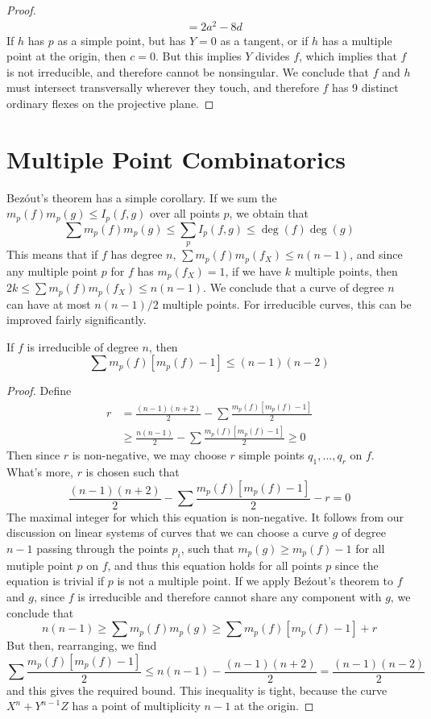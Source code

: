\begin{proof}
\begin{align*}
        &= 2a^2 - 8d
    \end{align*}
    If $h$ has $p$ as a simple point, but has $Y = 0$ as a tangent, or if $h$ has a multiple point at the origin, then $c = 0$. But this implies $Y$ divides $f$, which implies that $f$ is not irreducible, and therefore cannot be nonsingular. We conclude that $f$ and $h$ must intersect transversally wherever they touch, and therefore $f$ has 9 distinct ordinary flexes on the projective plane.
\end{proof}

\section{Multiple Point Combinatorics}

Bez\'{o}ut's theorem has a simple corollary. If we sum the $m_p(f) m_p(g) \leq I_p(f,g)$ over all points $p$, we obtain that
%
\[ \sum m_p(f)m_p(g) \leq \sum_p I_p(f,g) \leq \deg(f) \deg(g) \]
%
This means that if $f$ has degree $n$, $\sum m_p(f) m_p(f_X) \leq n(n-1)$, and since any multiple point $p$ for $f$ has $m_p(f_X) = 1$, if we have $k$ multiple points, then $2k \leq \sum m_p(f) m_p(f_X) \leq n(n-1)$. We conclude that a curve of degree $n$ can have at most $n(n-1)/2$ multiple points. For irreducible curves, this can be improved fairly significantly.

\begin{theorem}
    If $f$ is irreducible of degree $n$, then
    \[ \sum m_p(f)[m_p(f) - 1] \leq (n-1)(n-2) \]
\end{theorem}
\begin{proof}
    Define
    \begin{align*}
        r &= \frac{(n-1)(n+2)}{2} - \sum \frac{m_p(f)[m_p(f) - 1]}{2}\\
        &\geq \frac{n(n-1)}{2} - \sum \frac{m_p(f)[m_p(f) - 1]}{2} \geq 0
    \end{align*}
    Then since $r$ is non-negative, we may choose $r$ simple points $q_1, \dots, q_r$ on $f$. What's more, $r$ is chosen such that
    \[ \frac{(n-1)(n+2)}{2} - \sum \frac{m_p(f)[m_p(f) - 1]}{2} - r = 0 \]
    The maximal integer for which this equation is non-negative. It follows from our discussion on linear systems of curves that we can choose a curve $g$ of degree $n-1$ passing through the points $p_i$, such that $m_p(g) \geq m_p(f) - 1$ for all mutiple point $p$ on $f$, and thus this equation holds for all points $p$ since the equation is trivial if $p$ is not a multiple point. If we apply Be\'{z}out's theorem to $f$ and $g$, since $f$ is irreducible and therefore cannot share any component with $g$, we conclude that
    \[ n(n-1) \geq \sum m_p(f)m_p(g) \geq \sum m_p(f)[m_p(f) - 1] + r \]
    But then, rearranging, we find
    \[ \sum \frac{m_p(f)[m_p(f) - 1]}{2} \leq n(n-1) - \frac{(n-1)(n+2)}{2} = \frac{(n-1)(n-2)}{2} \]
    and this gives the required bound. This inequality is tight, because the curve $X^n + Y^{n-1}Z$ has a point of multiplicity $n-1$ at the origin.
\end{proof}

